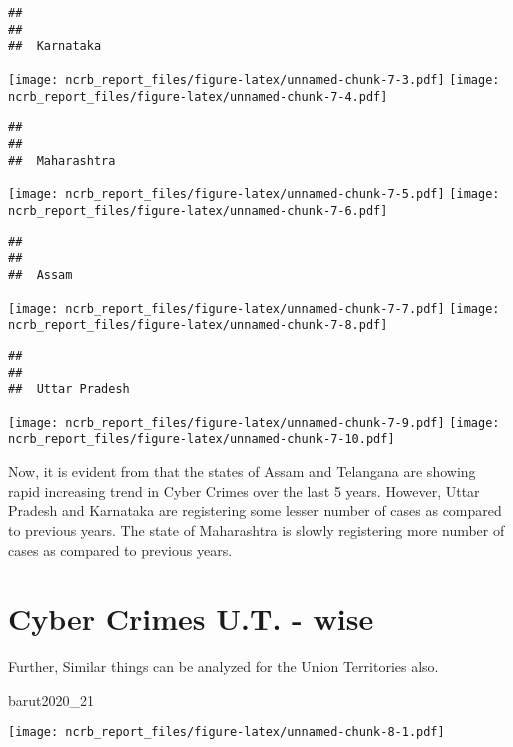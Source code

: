 \documentclass[
  12,
  a4paper,
]{report}
\newenvironment{Shaded}{\begin{snugshade}}{\end{snugshade}}
\newcommand{\NormalTok}[1]{#1}
\begin{document}
\begin{verbatim}
## 
## 
##  Karnataka
\end{verbatim}

\texttt{[image: ncrb\_report\_files/figure-latex/unnamed-chunk-7-3.pdf]}
\texttt{[image: ncrb\_report\_files/figure-latex/unnamed-chunk-7-4.pdf]}

\begin{verbatim}
## 
## 
##  Maharashtra
\end{verbatim}

\texttt{[image: ncrb\_report\_files/figure-latex/unnamed-chunk-7-5.pdf]}
\texttt{[image: ncrb\_report\_files/figure-latex/unnamed-chunk-7-6.pdf]}

\begin{verbatim}
## 
## 
##  Assam
\end{verbatim}

\texttt{[image: ncrb\_report\_files/figure-latex/unnamed-chunk-7-7.pdf]}
\texttt{[image: ncrb\_report\_files/figure-latex/unnamed-chunk-7-8.pdf]}

\begin{verbatim}
## 
## 
##  Uttar Pradesh
\end{verbatim}

\texttt{[image: ncrb\_report\_files/figure-latex/unnamed-chunk-7-9.pdf]}
\texttt{[image: ncrb\_report\_files/figure-latex/unnamed-chunk-7-10.pdf]}

Now, it is evident from that the states of Assam and Telangana are
showing rapid increasing trend in Cyber Crimes over the last 5 years.
However, Uttar Pradesh and Karnataka are registering some lesser number
of cases as compared to previous years. The state of Maharashtra is
slowly registering more number of cases as compared to previous years.

\hypertarget{cyber-crimes-u.t.---wise}{%
\section{Cyber Crimes U.T. - wise}\label{cyber-crimes-u.t.---wise}}

Further, Similar things can be analyzed for the Union Territories also.

\begin{Shaded}
\begin{Highlighting}[]
\NormalTok{barut2020\_21}
\end{Highlighting}
\end{Shaded}

\texttt{[image: ncrb\_report\_files/figure-latex/unnamed-chunk-8-1.pdf]}
\end{document}
